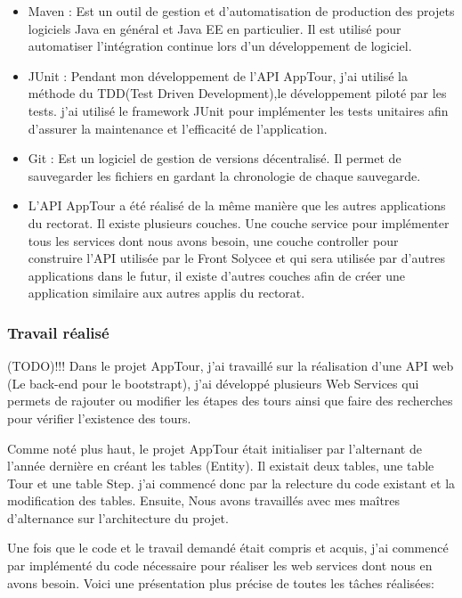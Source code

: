 \documentclass[12pt]{article}
\begin{document}
\begin{itemize}
\item Maven :  Est un outil de gestion et d'automatisation de production des projets logiciels Java en général et Java EE en particulier. Il est utilisé pour automatiser l'intégration continue lors d'un développement de logiciel.

\item JUnit : Pendant mon développement de l'API AppTour, j'ai utilisé la méthode du TDD(Test Driven Development),le développement piloté par les tests. j'ai utilisé le framework JUnit pour implémenter les tests unitaires afin d'assurer la maintenance et l'efficacité de l’application.

\item Git : Est un logiciel de gestion de versions décentralisé. Il permet de sauvegarder les fichiers en gardant la chronologie de chaque sauvegarde.

\item L'API AppTour a été réalisé de la même manière que les autres applications du rectorat. Il existe plusieurs couches. Une couche service pour implémenter tous les services dont nous avons besoin, une couche controller pour construire l'API utilisée par le Front Solycee et qui sera utilisée par d'autres applications dans le futur, il existe d'autres couches afin de créer une application similaire aux autres applis du rectorat.

\end{itemize}

\subsubsection{Travail réalisé}
(TODO)!!!
Dans le projet AppTour, j'ai travaillé sur la réalisation d'une API web (Le back-end pour le bootstrapt), j'ai développé plusieurs Web Services qui permets de rajouter ou modifier les étapes des tours ainsi que faire des recherches pour vérifier l’existence des tours. 

Comme noté plus haut, le projet AppTour était initialiser par l'alternant de l'année dernière en créant les tables (Entity). Il existait deux tables, une table Tour et une table Step. j'ai commencé donc par la relecture du code existant et la modification des tables.
Ensuite, Nous avons travaillés avec mes maîtres d'alternance sur l'architecture du projet.

Une fois que le code et le travail demandé était compris et acquis, j'ai commencé par implémenté du code nécessaire pour réaliser les web services dont nous en avons besoin. Voici une présentation plus précise de toutes les tâches réalisées:   
\end{document}
